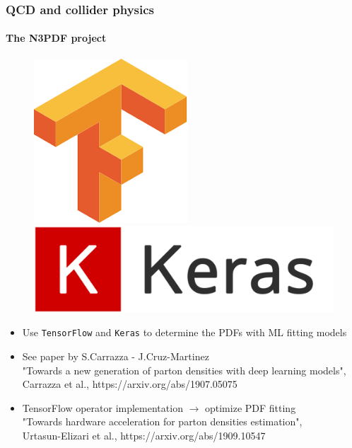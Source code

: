\documentclass[aspectratio=43]{beamer}
\begin{document}
\begin{frame}
	
	\frametitle{QCD and collider physics}
	\framesubtitle{The N3PDF project}
	
	\footnotesize
	
	\begin{figure}[!htb]
		\includegraphics[width = 0.5\linewidth]{plots/backup/TF.png}
		\endminipage\hfill
		\includegraphics[width = 0.5\linewidth]{plots/backup/Keras.png}
		\endminipage\hfill
	\end{figure}
	
	\begin{itemize}
		\item Use \texttt{TensorFlow} and \texttt{Keras} to determine the PDFs with ML fitting models
		\item See paper by S.Carrazza - J.Cruz-Martinez \\
		{\color{blue}"Towards a new generation of parton densities with deep learning models",\\
		Carrazza et al., https://arxiv.org/abs/1907.05075}
		\item TensorFlow operator implementation $\longrightarrow$ optimize PDF fitting \\
		{\color{blue}"Towards hardware acceleration for parton densities estimation",\\ Urtasun-Elizari et al., https://arxiv.org/abs/1909.10547}
	\end{itemize}

\end{frame}
\end{document}
